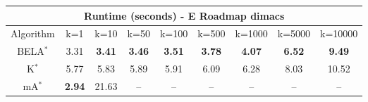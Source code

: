\begin{tabular}{c|cccccccc}\toprule
\multicolumn{9}{c}{Runtime (seconds) - E Roadmap dimacs}\\ \midrule
Algorithm & k=1 & k=10 & k=50 & k=100 & k=500 & k=1000 & k=5000 & k=10000 \\ \midrule
BELA$^*$ & 3.31 & \textbf{3.41} & \textbf{3.46} & \textbf{3.51} & \textbf{3.78} & \textbf{4.07} & \textbf{6.52} & \textbf{9.49} \\
K$^*$ & 5.77 & 5.83 & 5.89 & 5.91 & 6.09 & 6.28 & 8.03 & 10.52 \\
mA$^*$ & \textbf{2.94} & 21.63 & -- & -- & -- & -- & -- & -- \\ \bottomrule 
\end{tabular}
